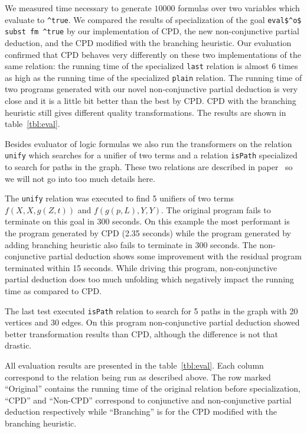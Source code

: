 We measured time necessary to generate $10000$ formulas over two variables which evaluate to \lstinline{^true}.
We compared the results of specialization of the goal \lstinline{eval$^o$ subst fm ^true} by our implementation of CPD, the new non-conjunctive partial deduction, and the CPD modified with the branching heuristic.
Our evaluation confirmed that CPD behaves very differently on these two implementations of the same relation: the running time of the specialized \lstinline{last} relation is almost 6 times as high as the running time of the specialized \lstinline{plain} relation.
The running time of two programs generated with our novel non-conjunctive partial deduction is very close and it is a little bit better than the best by CPD.
CPD with the branching heuristic still gives different quality transformations.
The results are shown in table~\ref{tbl:eval}.

Besides evaluator of logic formulas we also run the transformers on the relation \lstinline{unify} which searches for a unifier of two terms and a relation \lstinline{isPath} specialized to search for paths in the graph.
These two relations are described in paper~\cite{lozov2019relational} so we will not go into too much details here.

The \lstinline{unify} relation was executed to find 5 unifiers of two terms $f(X, X, g(Z, t))$ and $f(g(p, L), Y, Y)$.
The original \mk{} program fails to terminate on this goal in 300 seconds.
On this example the most performant is the program generated by CPD (2.35 seconds) while the program generated by adding branching heuristic also fails to terminate in 300 seconds.
The non-conjunctive partial deduction shows some improvement with the residual program terminated within 15 seconds.
While driving this program, non-conjunctive partial deduction does too much unfolding which negatively impact the running time as compared to CPD.

The last test executed \lstinline{isPath} relation to search for 5 paths in the graph with 20 vertices and 30 edges.
On this program non-conjunctive partial deduction showed better transformation results than CPD, although the difference is not that drastic.

All evaluation results are presented in the table~\ref{tbl:eval}.
Each column correspond to the relation being run as described above.
The row marked ``Original'' contains the running time of the original \mk{} relation before specialization, ``CPD'' and ``Non-CPD'' correspond to conjunctive and non-conjunctive partial deduction respectively while ``Branching'' is for the CPD modified with the branching heuristic.

